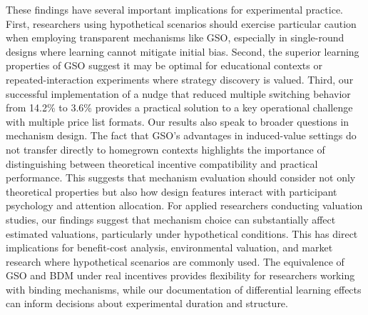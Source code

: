 \documentclass[12pt]{article}
\begin{document}
These findings have several important implications for experimental practice. First, researchers using hypothetical scenarios should exercise particular caution when employing transparent mechanisms like GSO, especially in single-round designs where learning cannot mitigate initial bias. Second, the superior learning properties of GSO suggest it may be optimal for educational contexts or repeated-interaction experiments where strategy discovery is valued. Third, our successful implementation of a nudge that reduced multiple switching behavior from 14.2\% to 3.6\% provides a practical solution to a key operational challenge with multiple price list formats.
Our results also speak to broader questions in mechanism design. The fact that GSO's advantages in induced-value settings do not transfer directly to homegrown contexts highlights the importance of distinguishing between theoretical incentive compatibility and practical performance. This suggests that mechanism evaluation should consider not only theoretical properties but also how design features interact with participant psychology and attention allocation.
For applied researchers conducting valuation studies, our findings suggest that mechanism choice can substantially affect estimated valuations, particularly under hypothetical conditions. This has direct implications for benefit-cost analysis, environmental valuation, and market research where hypothetical scenarios are commonly used. The equivalence of GSO and BDM under real incentives provides flexibility for researchers working with binding mechanisms, while our documentation of differential learning effects can inform decisions about experimental duration and structure.
\end{document}

